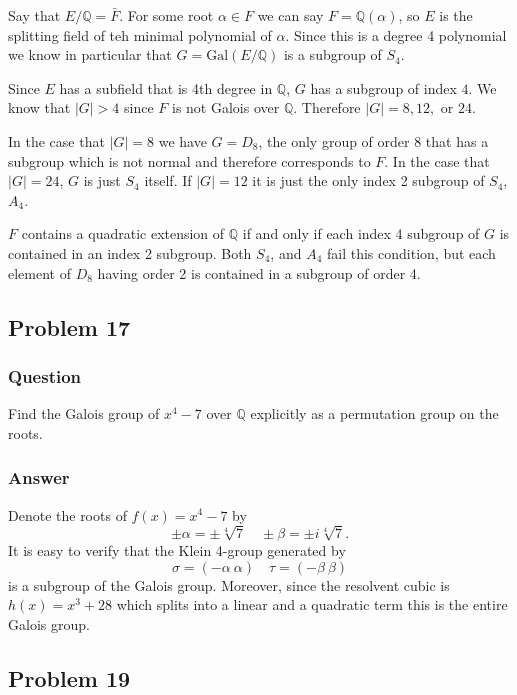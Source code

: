 \documentclass[10pt]{article}
\begin{document}
Say that $E /  \mathbb Q = \bar{F}$. For some root $\alpha \in F$ we can say $F= \mathbb{Q}(\alpha)$, so $E$ is the splitting field of teh minimal polynomial of $\alpha$. Since this is a degree 4 polynomial we know in particular that $G= \mathrm{Gal}(E / \mathbb{Q})$ is a subgroup of $S_4$. 

Since $E$ has a subfield that is 4th degree in $\mathbb{Q}$, $G$ has a subgroup of index $4$. We know that $|G|>4$ since $F$ is not Galois over $\mathbb{Q}$. Therefore $|G|=8,12,$ or $24$. 

In the case that $|G|= 8$ we have $G=D_8$, the only group of order 8 that has a subgroup which is not normal and therefore corresponds to $F$. In the case that $|G|=24$, $G$ is just $S_4$ itself. If $|G|=12$ it is just the only index 2 subgroup of $S_4$, $A_4$.

$F$ contains a quadratic extension of $\mathbb{Q}$ if and only if each index 4 subgroup of $G$ is contained in an index 2 subgroup. Both $S_4$, and $A_4$ fail this condition, but each element of $D_8$ having order 2 is contained in a subgroup of order 4.

\subsection{Problem 17}
\subsubsection{Question}
Find the Galois group of $x^4-7$ over $\mathbb{Q}$ explicitly as a permutation group on the roots.
\subsubsection{Answer}
Denote the roots of $f(x) = x^4-7 $ by
\[ \pm \alpha = \pm \sqrt[4] 7  \quad \pm \beta= \pm i \sqrt[4]7. \]
It is easy to verify that the Klein 4-group generated by 
\[\sigma = (-\alpha\  \alpha)\quad \tau = (-\beta\ \beta)\]
is a subgroup of the Galois group. Moreover, since the resolvent cubic is $h(x)=x^3+28$ which splits into a linear and a quadratic term this is the entire Galois group.

\subsection{Problem 19}
\end{document}
